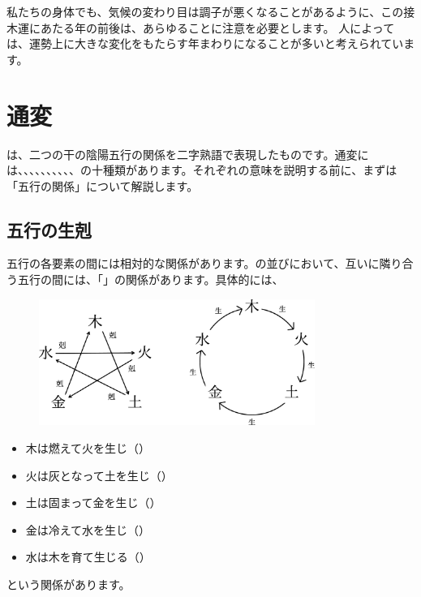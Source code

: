 \documentclass[a5paper,11pt,dvipdfmx]{tarticle}
\begin{document}
私たちの身体でも、気候の変わり目は調子が悪くなることがあるように、この接木運にあたる年の前後は、あらゆることに注意を必要とします。
人によっては、運勢上に大きな変化をもたらす年まわりになることが多いと考えられています。



\clearpage

\section{通変}

は、二つの干の陰陽五行の関係を二字熟語で表現したものです。通変には、、、、、、、、、、の十種類があります。それぞれの意味を説明する前に、まずは「五行の関係」について解説します。

\subsection{五行の生剋}
五行の各要素の間には相対的な関係があります。の並びにおいて、互いに隣り合う五行の間には、「」の関係があります。具体的には、

\begin{figure}
  \includegraphics[width=90mm,angle=90]{figs/figure5-1.eps}
\end{figure}

\begin{itemize}
\item 木は燃えて火を生じ（）
\item 火は灰となって土を生じ（）
\item 土は固まって金を生じ（）
\item 金は冷えて水を生じ（）
\item 水は木を育て生じる（）
\end{itemize}
という関係があります。
\end{document}
